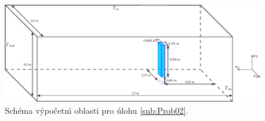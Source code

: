         \begin{figure}[H]
            \centering
            \includegraphics[width=\linewidth]{Img/Kapitola 3/Radiator_domain_without_mono.pdf}
            \caption{Sch\'{e}ma v\'{y}po\v{c}etn\'{\i} oblasti pro \'{u}lohu \ref{sub:Prob02}.}
            \label{fig:Probl02_domain}
        \end{figure}

        
        
        
        

